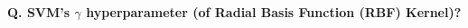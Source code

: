 \begin{frame}[fragile]{\textbf{Q. SVM's $\gamma$ hyperparameter (of Radial Basis
      Function (RBF) Kernel)?}}
\begin{columns}[T]
\begin{column}{.28\textwidth}
{{{          }
        }
      }
      \vspace{3cm}
    \end{column}%
  \end{columns}
\end{frame}



